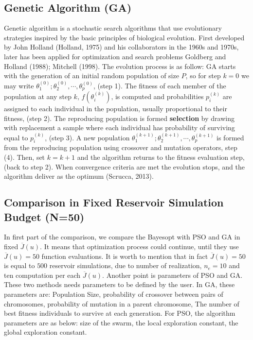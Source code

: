 \documentclass[]{elsarticle} %
\begin{document}
\begin{eqution}
\hypertarget{genetic-algorithm-ga}{%
\subsection{Genetic Algorithm (GA)}\label{genetic-algorithm-ga}}

Genetic algorithm is a stochastic search algorithms that use evolutionary strategies inspired by the basic principles of biological evolution. First developed by John Holland (Holland, 1975) and his collaborators in the 1960s and 1970s, later has been applied for optimization and search problems Goldberg and Holland (1988); Mitchell (1998). The evolution process is as follow: GA starts with the generation of an initial random population of size \(P\), so for step \(k = 0\) we may write \({\theta_1^{(0)}; \theta_2^{(0)},\cdots, \theta_p^{(0)}}\), (step 1). The fitness of each member of the population at any step \(k\), \(f(\theta_i^{(k)})\), is computed and probabilities \(p_i^{(k)}\) are assigned to each individual in the population, usually proportional to their fitness, (step 2). The reproducing population is formed \textbf{selection} by drawing with replacement a sample where each individual has probability of surviving equal to \(p_i^{(k)}\), (step 3). A new population \({\theta_1^{(k+1)}; \theta_2^{(k+1)},\cdots, \theta_p^{(k+1)}}\) is formed from the reproducing population using crossover and mutation operators, step (4). Then, set \(k = k + 1\) and the algorithm returns to the fitness evaluation step, (back to step 2). When convergence criteria are met the evolution stops, and the algorithm deliver as the optimum (Scrucca, 2013).

\hypertarget{comparison-in-fixed-reservoir-simulation-budget-n50}{%
\subsection{Comparison in Fixed Reservoir Simulation Budget (N=50)}\label{comparison-in-fixed-reservoir-simulation-budget-n50}}

In first part of the comparison, we compare the Bayesopt with PSO and GA in fixed \(\overline{J}(u)\). It means that optimization process could continue, until they use \(\overline{J}(u)=50\) function evaluations. It is worth to mention that in fact \(\overline{J}(u)=50\) is equal to \(500\) reservoir simulations, due to number of realization, \(n_e=10\) and ten computation per each \(\overline{J}(u)\). Another point is parameters of PSO and GA. These two methods needs parameters to be defined by the user. In GA, these parameters are: Population Size, probability of crossover between pairs of chromosomes, probability of mutation in a parent chromosome, The number of best fitness individuals to survive at each generation. For PSO, the algorithm parameters are as below: size of the swarm, the local exploration constant, the global exploration constant.


\end{eqution}
\end{document}
